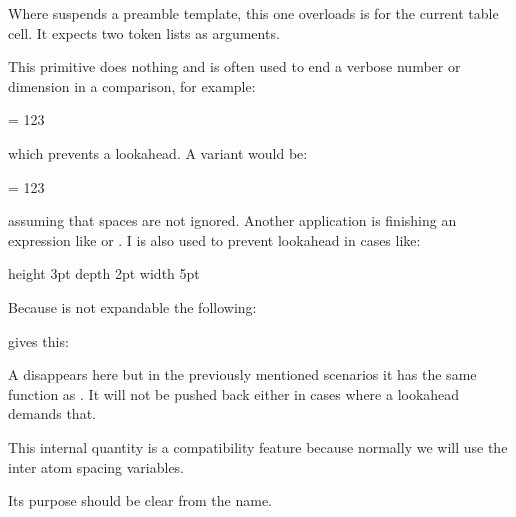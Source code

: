 \stopnewprimitive

\startnewprimitive[title={\prm {realign}}]

Where  suspends a preamble template, this one overloads is for the
current table cell. It expects two token lists as arguments.

\stopnewprimitive

\startoldprimitive[title={\prm {relax}}]

This primitive does nothing and is often used to end a verbose number or
dimension in a comparison, for example:

\starttyping
\ifnum \scratchcounter = 123\relax
\stoptyping

which prevents a lookahead. A variant would be:

\starttyping
\ifnum \scratchcounter = 123 %
\stoptyping

assuming that spaces are not ignored. Another application is finishing
an expression like  or . I is also used
to prevent lookahead in cases like:

\starttyping
\vrule height 3pt depth 2pt width 5pt\relax
{}\relax
\stoptyping

Because  is not expandable the following:

\startbuffer
\edef\foo{\relax}   \meaningfull\foo
\edef\oof{\norelax} \meaningfull\oof
\stopbuffer

\typebuffer

gives this:

\startlines
\getbuffer
\stoplines

A  disappears here but in the previously mentioned scenarios
it has the same function as . It will not be pushed back either
in cases where a lookahead demands that.

\stopoldprimitive

\startoldprimitive[title={\prm {relpenalty}}]

This internal quantity is a compatibility feature because normally we will use
the inter atom spacing variables.

\stopoldprimitive

\startnewprimitive[title={\prm {resetlocalboxes}}]

Its purpose should be clear from the name.

\stopnewprimitive

\startnewprimitive[title={\prm {resetmathspacing}}]

